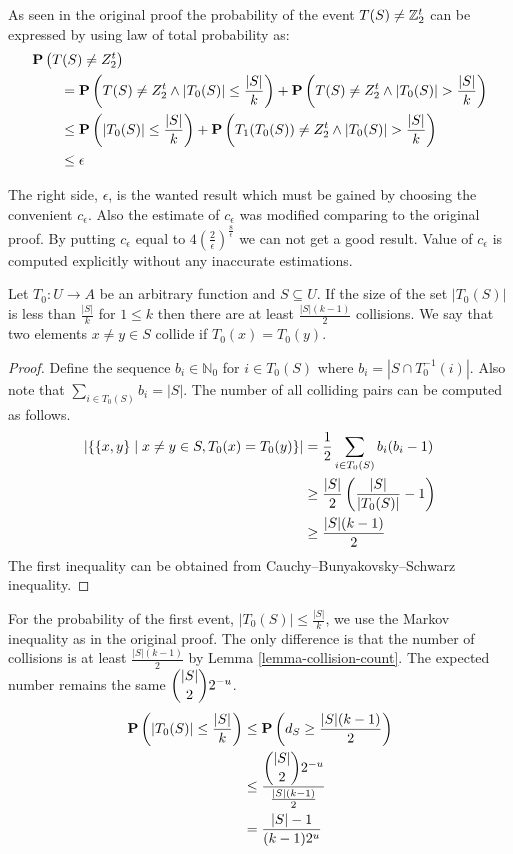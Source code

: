 As seen in the original proof the probability of the event $T(S) \neq \mathbb{Z}_{2}^{t}$ can be expressed by using law of total probability as:
\[
\begin{split}
& \mathbf{P}\left(T(S) \neq Z_2^t\right) \\
    & \qquad = \mathbf{P}\left(T(S) \neq Z_2^t \wedge |T_0(S)| \leq \frac{|S|}{k}\right) + \mathbf{P}\left(T(S) \neq Z_2^t \wedge |T_0(S)| > \frac{|S|}{k}\right) \\ 
    & \qquad \leq \mathbf{P}\left(|T_0(S)| \leq \frac{|S|}{k}\right) + \mathbf{P}\left(T_1(T_0(S)) \neq Z_2^t \wedge |T_0(S)| > \frac{|S|}{k}\right) \\
    & \qquad \leq \epsilon \\
\end{split}
\]

The right side, $\epsilon$, is the wanted result which must be gained by choosing the convenient $c_{\epsilon}$. Also the estimate of $c_{\epsilon}$ was modified comparing to the original proof. By putting $c_{\epsilon}$ equal to $4\left(\frac{2}{\epsilon}\right)^{\frac{8}{\epsilon}}$ we can not get a good result. Value of $c_{\epsilon}$ is computed explicitly without any inaccurate estimations.

\begin{lemma}
\label{lemma-collision-count}
Let $T_0: U \rightarrow A$ be an arbitrary function and $S \subseteq U$. If the size of the set $|T_0(S)|$ is less than $\frac{|S|}{k}$ for $1 \leq k$ then there are at least $\frac{|S|(k - 1)}{2}$ collisions. We say that two elements $x \neq y \in S$ collide if $T_0(x) = T_0(y)$.
\end{lemma} 
\begin{proof}
Define the sequence $b_i \in \mathbb{N}_0$ for $i \in T_0(S)$ where $b_i = \left|S \cap T_0^{-1}(i)\right|$. Also note that $\sum_{i \in T_0(S)} b_i = |S|$.
The number of all colliding pairs can be computed as follows.
\[
\begin{split}
|\{ \{x, y\} \mid x \neq y \in S, T_0(x) = T_0(y) \}| 
	& = \frac{1}{2} \sum_{i \in T_0(S)} b_i (b_i - 1) \\ 
	& \geq \frac{|S|}{2}\left(\frac{|S|}{|T_0(S)|} - 1\right) \\
	& \geq \frac{|S|(k - 1)}{2}
\end{split}
\]
The first inequality can be obtained from Cauchy–Bunyakovsky–Schwarz inequality.
\end{proof}

For the probability of the first event, $|T_0(S)| \leq \frac{|S|}{k}$, we use the Markov inequality as in the original proof. The only difference is that the number of collisions is at least $\frac{|S|(k - 1)}{2}$ by Lemma \ref{lemma-collision-count}. The expected number remains the same $\dbinom{|S|}{2}2 ^ {-u}$.
\[
\begin{split}
\mathbf{P}\left(|T_0(S)| \leq \frac{|S|}{k}\right) 
	& \leq \mathbf{P}\left(d_S \geq \frac{|S|(k - 1)}{2}\right) \\
	& \leq \frac{\dbinom{|S|}{2}2 ^ {-u}}{\frac{|S|(k - 1)}{2}} \\
	& = \frac{|S| - 1}{(k - 1) 2^u} \\
\end{split}
\]


